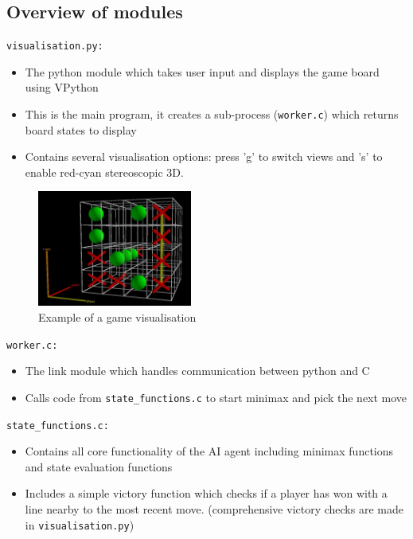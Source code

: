 \documentclass[10pt,twocolumn]{article}
\begin{document}
\subsection{Overview of modules}
\texttt{visualisation.py:}
\begin{itemize}
\item The python module which takes user input and displays the game board using VPython
\item This is the main program, it creates a sub-process (\texttt{worker.c}) which returns
board states to display
\item Contains several visualisation options: press 'g' to switch views and 's' to enable
red-cyan stereoscopic 3D.
\end{itemize}
\begin{figure}[h]
  \begin{center}
    \includegraphics[width=2in]{vis.jpg}
  \end{center}
  \caption{Example of a game visualisation}
  \label{fig:vis}
\end{figure}
\texttt{worker.c:}
\begin{itemize}
\item The link module which handles communication between python and C
\item Calls code from \texttt{state\_functions.c} to start minimax and pick the next move
\end{itemize}
\texttt{state\_functions.c:}
\begin{itemize}
\item Contains all core functionality of the AI agent including minimax functions and state
evaluation functions
\item Includes a simple victory function which checks if a player has won with a line nearby to
the most recent move. (comprehensive victory checks are made in \texttt{visualisation.py})
\end{itemize}
\end{document}
